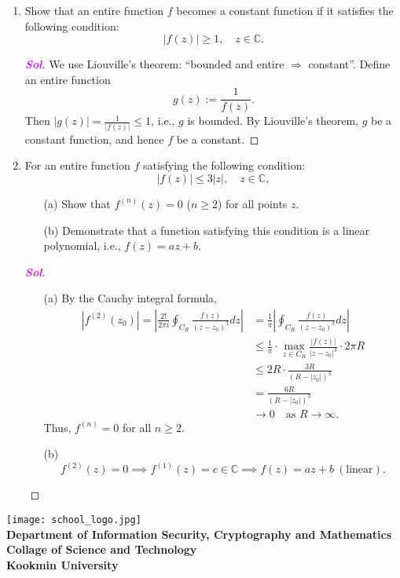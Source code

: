\documentclass{article}
\newcommand{\footer}[1]{
	\begin{flushright}
		\vspace{2em}
		\texttt{[image: school\_logo.jpg]} \\
		\vspace{1em}
		\textcolor{blue2}{\small\textbf{#1}}
	\end{flushright}
}
\newcommand{\ie}{\textnormal{i.e.}}
\theoremstyle{definition}
\newcommand{\C}{\mathbb{C}}
\newcommand{\of}[1]{\left( #1 \right)}
\newcommand{\abs}[1]{\left\lvert #1 \right\rvert}
\newcommand{\sol}{\textcolor{magenta}{\bf Sol}}
\begin{document}
\begin{enumerate}
		\newpage
		\item Show that an entire function $f$ becomes a constant function if it satisfies the following condition: \[
		\abs{f\of{z}}\geq 1,\quad z\in\C.
		\]
		\begin{proof}[\sol]
			We use Liouville's theorem: ``bounded and entire $\Rightarrow$ constant''. Define an entire function \[
			g\of{z}:=\frac{1}{f\of{z}}.
			\] Then $\abs{g\of{z}}=\frac{1}{\abs{f\of{z}}}\leq 1$, \ie, $g$ is bounded. By Liouville's theorem, $g$ be a constant function, and hence $f$ be a constant.
		\end{proof}
		\vspace{8pt}
		\item For an entire function $f$ satisfying the following condition: \[
		\abs{f\of{z}}\leq 3\abs{z},\quad z\in\C,
		\] \begin{enumerate}
			\item[(a)] Show that $f^{(n)}(z) = 0$ ($n\geq 2$) for all points $z$.
			\item[(b)] Demonstrate that a function satisfying this condition is a linear polynomial, \ie, $f(z) = az + b$.
		\end{enumerate}\begin{proof}[\sol]
			\begin{itemize}
				\item[(a)] By the Cauchy integral formula, \begin{align*}
				\abs{f^{(2)}\of{z_0}}=\abs{\frac{2!}{2\pi i}\oint_{C_R}\frac{f\of{z}}{\of{z-z_0}^3}dz}&=\frac{1}{\pi}\abs{\oint_{C_R}\frac{f(z)}{(z-z_0)^3}dz}\\
				&\leq\frac{1}{\pi}\cdot\max_{z\in C_R}\frac{\abs{f\of{z}}}{\abs{z-z_0}^3}\cdot 2\pi R\\
				&\leq 2R\cdot\frac{3R}{\of{R-\abs{z_0}}^3}\\
				&=\frac{6R}{\of{R-\abs{z_0}}^3}\\
				&\to 0\quad\text{as $R\to\infty$}.
				\end{align*} Thus, $f^{(n)}=0$ for all $n\geq 2$.
				\vspace{4pt}
				\item[(b)] \[
				f^{(2)}(z)=0\implies f^{(1)}(z)=c\in\C\implies f(z)=az+b\ (\text{linear}).
				\]
			\end{itemize}
		\end{proof}
	\end{enumerate}
	
	
	\footer{Department of Information Security, Cryptography and Mathematics\\
	Collage of Science and Technology\\
	Kookmin University}
\end{document}
